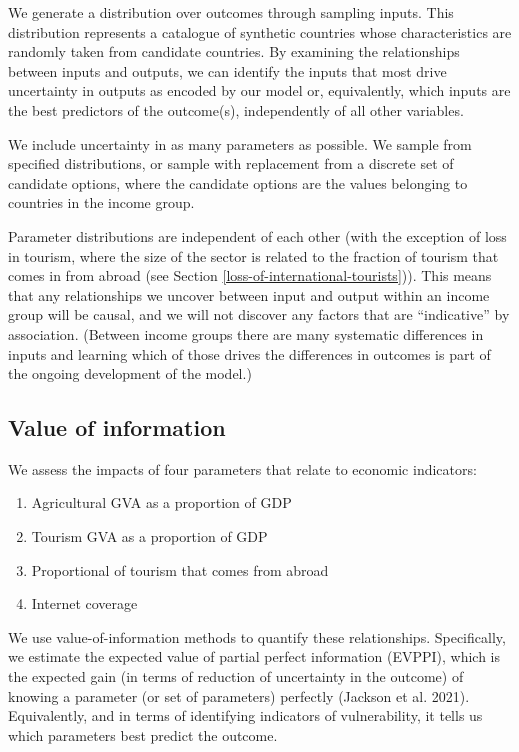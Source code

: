 \documentclass[
]{article}
\providecommand{\tightlist}{%
  \setlength{\itemsep}{0pt}\setlength{\parskip}{0pt}}
\begin{document}
We generate a distribution over outcomes through sampling inputs. This distribution represents a catalogue of synthetic countries whose characteristics are randomly taken from candidate countries. By examining the relationships between inputs and outputs, we can identify the inputs that most drive uncertainty in outputs as encoded by our model or, equivalently, which inputs are the best predictors of the outcome(s), independently of all other variables.

We include uncertainty in as many parameters as possible. We sample from specified distributions, or sample with replacement from a discrete set of candidate options, where the candidate options are the values belonging to countries in the income group.

Parameter distributions are independent of each other (with the exception of loss in tourism, where the size of the sector is related to the fraction of tourism that comes in from abroad (see Section \ref{loss-of-international-tourists})). This means that any relationships we uncover between input and output within an income group will be causal, and we will not discover any factors that are ``indicative'' by association. (Between income groups there are many systematic differences in inputs and learning which of those drives the differences in outcomes is part of the ongoing development of the model.)

\hypertarget{value-of-information}{%
\subsection{Value of information}\label{value-of-information}}

We assess the impacts of four parameters that relate to economic indicators:

\begin{enumerate}
\def\labelenumi{\arabic{enumi}.}
\tightlist
\item
  Agricultural GVA as a proportion of GDP
\item
  Tourism GVA as a proportion of GDP
\item
  Proportional of tourism that comes from abroad
\item
  Internet coverage
\end{enumerate}

We use value-of-information methods to quantify these relationships. Specifically, we estimate the expected value of partial perfect information (EVPPI), which is the expected gain (in terms of reduction of uncertainty in the outcome) of knowing a parameter (or set of parameters) perfectly (Jackson et al. 2021). Equivalently, and in terms of identifying indicators of vulnerability, it tells us which parameters best predict the outcome.
\end{document}
